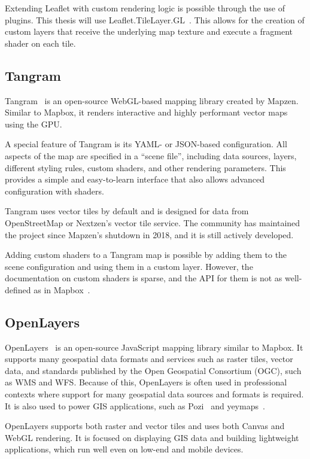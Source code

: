 Extending Leaflet with custom rendering logic is possible through the use of plugins. This thesis will use Leaflet.TileLayer.GL~\cite{leaflet:tilelayergl}. This allows for the creation of custom layers that receive the underlying map texture and execute a fragment shader on each tile.

\subsection{Tangram}

Tangram~\cite{tangram:home} is an open-source WebGL-based mapping library created by Mapzen. Similar to Mapbox, it renders interactive and highly performant vector maps using the GPU\@.

A special feature of Tangram is its YAML- or JSON-based configuration\@. All aspects of the map are specified in a ``scene file'', including data sources, layers, different styling rules, custom shaders, and other rendering parameters. This provides a simple and easy-to-learn interface that also allows advanced configuration with shaders.

Tangram uses vector tiles by default and is designed for data from OpenStreetMap or Nextzen's vector tile service. The community has maintained the project since Mapzen's shutdown in 2018, and it is still actively developed.

Adding custom shaders to a Tangram map is possible by adding them to the scene configuration and using them in a custom layer. However, the documentation on custom shaders is sparse, and the API for them is not as well-defined as in Mapbox\ \cite{tangram:docs}.

\subsection{OpenLayers}

OpenLayers\ \cite{openlayers:main} is an open-source JavaScript mapping library similar to Mapbox. It supports many geospatial data formats and services such as raster tiles, vector data, and standards published by the Open Geospatial Consortium (OGC), such as WMS and WFS\@. Because of this, OpenLayers is often used in professional contexts where support for many geospatial data sources and formats is required. It is also used to power GIS applications, such as Pozi~\cite{openlayers:pozi} and yeymaps~\cite{openlayers:yeymaps}.

OpenLayers supports both raster and vector tiles and uses both Canvas and WebGL rendering. It is focused on displaying GIS data and building lightweight applications, which run well even on low-end and mobile devices.

